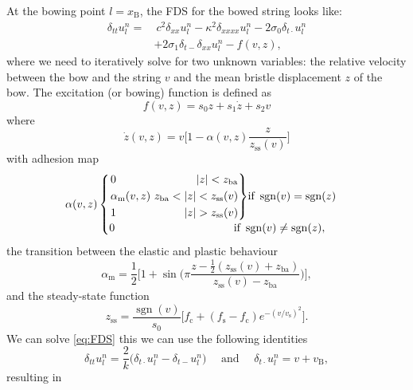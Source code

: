 \documentclass[twoside,a4paper]{article}
\newenvironment{rcases}
  {\left.\begin{alignedat}{2}}
  {\end{alignedat}\right\rbrace}
\DeclareMathOperator{\sgn}{sgn}
\begin{document}
At the bowing point $l=x_\text{B}$, the FDS for the bowed string looks like:
\begin{equation}
    \begin{aligned}
    \label{eq:FDS}
        \delta_{tt} u_l^n = &\: c^2 \delta_{xx} u_l^n -\kappa^2\delta_{xxxx} u_l^n - 2\sigma_0\delta_{t\cdot} u_l^n
        \\ 
        &+ 2\sigma_1\delta_{t-}\delta_{xx}u_l^n - f(v, z),
    \end{aligned}
\end{equation}
where we need to iteratively solve for two unknown variables: the relative velocity between the bow and the string $v$ and the mean bristle displacement $z$ of the bow.
The excitation (or bowing) function is defined as
\begin{equation}
    f(v, z) = s_0z + s_1\dot z + s_2v
\end{equation}
where 
\begin{equation}\label{eq:zdot}
    \dot z(v, z) = v\bigg[1-\alpha(v, z)\frac{z}{z_\text{ss}(v)}\bigg]
\end{equation}
with adhesion map
\begin{equation}
\alpha(v, z) 
    \begin{cases}
    \begin{rcases}
        &0 & |z| < z_\text{ba}\\
       &\alpha_\text{m}(v,z)&\  z_\text{ba}<|z|<z_\text{ss}(v)\\
        &1 &|z|>z_\text{ss}(v)
        \end{rcases}\text{if}\  \sgn(v)=\sgn(z)\\
        0\hspace{107pt}\text{if}\  \sgn(v)\neq\sgn(z),
    \end{cases}
\end{equation}
the transition between the elastic and plastic behaviour
\begin{equation}
    \alpha_\text{m} = \frac{1}{2}\bigg[1+\sin\bigg(\pi\frac{z-\frac{1}{2}(z_\text{ss}(v)+z_\text{ba})}{z_\text{ss}(v)-z_\text{ba}}\bigg)\bigg],
\end{equation}
and the steady-state function
\begin{equation}
    z_\text{ss} = \frac{\sgn(v)}{s_0}\Big[f_\text{c}+(f_\text{s}-f_\text{c})e^{-(v/v_\text{s})^2}\Big].
\end{equation}
We can solve \eqref{eq:FDS} this we can use the following identities
\begin{equation}
    \delta_{tt}u_l^n = \frac{2}{k}\big(\delta_{t\cdot}u_l^n-\delta_{t-}u_l^n\big) \quad \text{ and } \quad \delta_{t\cdot}u_l^n = v + v_\text{B},
\end{equation}
resulting in 
\end{document}
